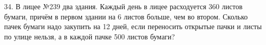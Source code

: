 34. В лицее №239 два здания. Каждый день в лицее расходуется 360 листов бумаги, причём в первом здании на 6 листов больше, чем во втором. Сколько пачек бумаги надо закупить на 12 дней, если переносить открытые пачки и листы по улице нельзя, а в каждой пачке 500 листов бумаги?\\
